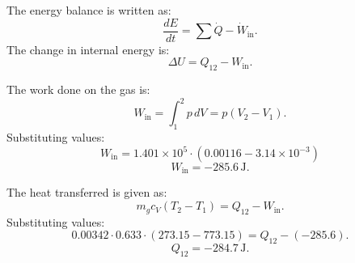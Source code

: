 The energy balance is written as:  
\[
\frac{dE}{dt} = \sum \dot{Q} - \dot{W}_{\text{in}}.
\]  
The change in internal energy is:  
\[
\Delta U = Q_{12} - W_{\text{in}}.
\]  

The work done on the gas is:  
\[
W_{\text{in}} = \int_{1}^{2} p \, dV = p (V_2 - V_1).
\]  
Substituting values:  
\[
W_{\text{in}} = 1.401 \times 10^5 \cdot (0.00116 - 3.14 \times 10^{-3})
\]  
\[
W_{\text{in}} = -285.6 \, \text{J}.
\]  

The heat transferred is given as:  
\[
m_g c_V (T_2 - T_1) = Q_{12} - W_{\text{in}}.
\]  
Substituting values:  
\[
0.00342 \cdot 0.633 \cdot (273.15 - 773.15) = Q_{12} - (-285.6).
\]  
\[
Q_{12} = -284.7 \, \text{J}.
\]